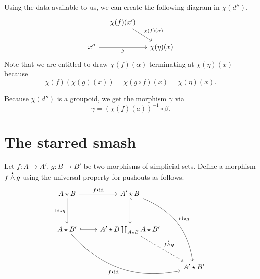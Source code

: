 \documentclass[main.tex]{subfiles}
\begin{document}
\begin{example}
\begin{itemize}
      Using the data available to us, we can create the following diagram in $\chi(d'')$.
      \begin{equation*}
        \begin{tikzcd}[column sep=small]
          & \chi(f)(x')
          \arrow[dr, "\chi(f)(\alpha)"]
          \\
          x''
          \arrow[rr, swap, "\beta"]
          && \chi(\eta)(x)
        \end{tikzcd}
      \end{equation*}
      Note that we are entitled to draw $\chi(f)(\alpha)$ terminating at $\chi(\eta)(x)$ because
      \begin{equation*}
        \chi(f)(\chi(g)(x)) = \chi(g \circ f)(x) = \chi(\eta)(x).
      \end{equation*}

      Because $\chi(d'')$ is a groupoid, we get the morphism $\gamma$ via
      \begin{equation*}
        \gamma = (\chi(f)(a))^{-1} \circ \beta.
      \end{equation*}
  \end{itemize}

\end{example}


\section{The starred smash}
\label{sec:the_starred_smash}

\begin{definition}
  \label{def:starred_smash}
  Let $f\colon A \to A'$, $g\colon B \to B'$ be two morphisms of simplicial sets. Define a morphism $f \overset{\star}{\wedge} g$ using the universal property for pushouts as follows.
  \begin{equation*}
    \begin{tikzcd}[row sep=huge]
      A \star B
      \arrow[r, "f \star \id"]
      \arrow[d, swap, "\id \star g"]
      & A' \star B
      \arrow[ddr, bend left, "\id \star g"]
      \arrow[d, hookrightarrow]
      \\
      A \star B'
      \arrow[r, hookrightarrow]
      \arrow[rrd, swap, bend right, "f \star \id"]
      & A' \star B \coprod_{A \star B} A \star B'
      \arrow[dr, dashed, "f \ssmash g"]
      \\
      && A' \star B'
    \end{tikzcd}
  \end{equation*}
\end{definition}
\end{document}
